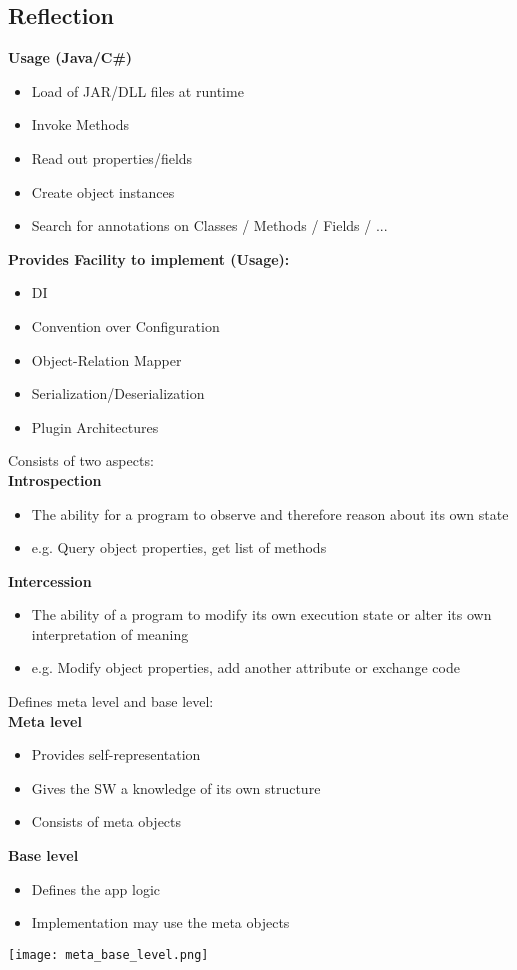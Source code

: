 \subsection{Reflection}
\textbf{Usage (Java/C\#)}
\begin{itemize}[topsep=0pt]
    \itemsep -0.4em
    \item Load of JAR/DLL files at runtime
    \item Invoke Methods
    \item Read out properties/fields 
    \item Create object instances 
    \item Search for annotations on Classes / Methods / Fields / ...
\end{itemize}
\textbf{Provides Facility to implement (Usage):}
\begin{itemize}[topsep=0pt]
    \itemsep -0.4em
    \item DI
    \item Convention over Configuration
    \item Object-Relation Mapper
    \item Serialization/Deserialization
    \item Plugin Architectures
\end{itemize}
Consists of two aspects:\\ 
\textbf{Introspection}
\begin{itemize}[topsep=0pt]
    \itemsep -0.4em
    \item The ability for a program to observe and therefore reason about its own state
    \item e.g. Query object properties, get list of methods
\end{itemize}
\textbf{Intercession}
\begin{itemize}[topsep=0pt]
    \itemsep -0.4em
    \item The ability of a program to modify its own execution state or alter its own interpretation of meaning
    \item e.g. Modify object properties, add another attribute or exchange code
\end{itemize}
Defines meta level and base level:\\ 
\textbf{Meta level}
\begin{itemize}[topsep=0pt]
    \itemsep -0.4em
    \item Provides self-representation
    \item Gives the SW a knowledge of its own structure
    \item Consists of meta objects
\end{itemize}
\textbf{Base level}
\begin{itemize}[topsep=0pt]
    \itemsep -0.4em
    \item Defines the app logic
    \item Implementation may use the meta objects
\end{itemize}
\texttt{[image: meta\_base\_level.png]}
